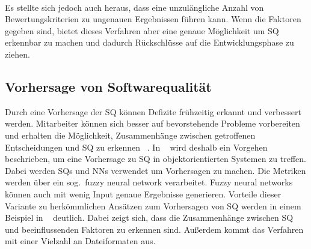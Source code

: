 \\
Es stellte sich jedoch auch heraus, dass eine unzulängliche Anzahl von Bewertungskriterien zu ungenauen Ergebnissen führen kann.
Wenn die Faktoren gegeben sind, bietet dieses Verfahren aber eine genaue Möglichkeit um SQ erkennbar zu machen und dadurch Rückschlüsse auf die Entwicklungsphase zu ziehen.

\subsection{Vorhersage von Softwarequalität}
Durch eine Vorhersage der SQ können Defizite frühzeitig erkannt und verbessert werden. Mitarbeiter können sich besser auf bevorstehende Probleme vorbereiten und erhalten die Möglichkeit, Zusammenhänge zwischen getrof\-fenen Entscheidungen und SQ zu erkennen ~\cite{Peng2009}. In ~\cite{Peng2009} wird deshalb ein Vorgehen beschrieben, um eine Vorhersage zu SQ in objektorientierten Systemen zu treffen. Dabei werden SQs und NNs verwendet um Vorhersagen zu machen. Die Metriken werden über ein sog.~fuzzy neural network verarbeitet. Fuzzy neural networks können auch mit wenig Input genaue Ergebnisse generieren.
Vorteile dieser Variante zu herkömmlichen Ansätzen zum Vorhersagen von SQ werden in einem Beispiel in ~\cite{Peng2009} deutlich. Dabei zeigt sich, dass die Zusammenhänge zwischen SQ und beeinflussenden Faktoren zu erkennen sind. Außerdem kommt das Verfahren mit einer Vielzahl an Dateiformaten aus.
\\